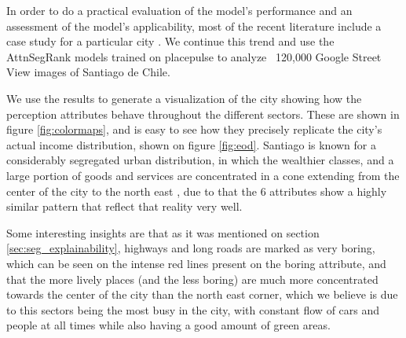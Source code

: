 In order to do a practical evaluation of the model's performance and an assessment
of the model's applicability, most of the recent literature include a case study
for  a particular city \cite{rossetti, zhang_measuring, zhang_uncovering, quercia_aesthetic,tamara_judgments,liu_machine}.
We continue this trend and use the AttnSegRank models trained on placepulse
to analyze ~120,000 Google Street View images of Santiago de Chile.

We use the results to generate a visualization of the city showing how the perception
attributes behave throughout the different sectors. These are shown in figure
\ref{fig:colormaps}, and is easy to see how they precisely replicate the city's actual
income distribution, shown on figure \ref{fig:eod}. Santiago is known for a considerably
segregated urban distribution, in which the wealthier classes, and a large portion
of goods and services are concentrated in a cone extending from the center of the city
to the north east \cite{sabatini_segregacion}, due to that the 6 attributes show a
highly similar pattern that reflect that reality very well.

Some interesting insights are that as it was mentioned on section \ref{sec:seg_explainability},
highways and long roads are marked as very boring, which can be seen on the intense
red lines present on the boring attribute, and that the more lively places (and the less boring)
are much more concentrated towards the center of the city than the north east corner, which
we believe is due to this sectors being the most busy in the city, with constant flow
of cars and people at all times while also having a good amount of green areas.

